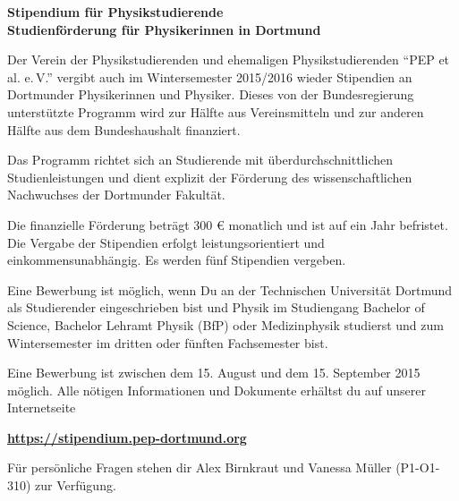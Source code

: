 \documentclass[
  paper=a4,
  fontsize=12pt,
  DIV=16,
  headheight=52pt,
  footheight=45pt,
  headinclude,
  parskip=full,
]{scrartcl}
\date{31. Juli 2014}
\begin{document}
\textbf{\Huge\sffamily Stipendium für Physikstudierende}\\[0.5\baselineskip]
\textbf{\Large\sffamily Studienförderung für  Physikerinnen in Dortmund}

{\large Der Verein der Physikstudierenden und ehemaligen Physikstudierenden \enquote{PEP et al. e.\,V.}
vergibt auch im Wintersemester 2015/2016 wieder Stipendien an Dortmunder Physikerinnen und Physiker.
Dieses von der Bundesregierung unterstützte Programm wird zur
Hälfte aus Vereinsmitteln und zur anderen Hälfte aus dem Bundeshaushalt finanziert.
}

Das Programm richtet sich an Studierende mit überdurchschnittlichen Studienleistungen und dient explizit der Förderung des wissenschaftlichen Nachwuchses der Dortmunder Fakultät.

Die finanzielle Förderung beträgt 300 € monatlich und ist auf ein Jahr befristet.
Die Vergabe der Stipendien erfolgt leistungsorientiert und einkommensunabhängig.
Es werden fünf Stipendien vergeben.

Eine Bewerbung ist möglich, wenn Du an der Technischen Universität Dortmund als Studierender eingeschrieben bist und Physik im Studiengang Bachelor of Science, Bachelor
Lehramt Physik (BfP) oder Medizinphysik studierst und zum Wintersemester im dritten
oder fünften Fachsemester bist.

Eine Bewerbung ist zwischen dem 15. August und dem 15. September 2015 möglich.
Alle nötigen Informationen und Dokumente erhältst du auf unserer Internetseite

\begin{center}
  \Huge\bfseries\url{https://stipendium.pep-dortmund.org}
\end{center}

Für persönliche Fragen stehen dir Alex Birnkraut und Vanessa Müller (P1-O1-310) zur
Verfügung.
\end{document}
